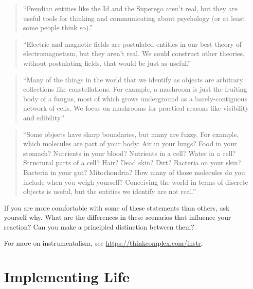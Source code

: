 \documentclass[12pt]{book}
\theoremstyle{exercise}
\begin{document}

\begin{quote}
``Freudian entities like the Id and the Superego aren't real, but they
  are useful tools for thinking and communicating about psychology (or
  at least some people think so).''
\end{quote}


\begin{quote}
``Electric and magnetic fields are postulated entities in our best
  theory of electromagnetism, but they aren't real.  We could
  construct other theories, without postulating fields, that would be
  just as useful.''
\end{quote}


\begin{quote}
``Many of the things in the world that we identify as objects are
  arbitrary collections like constellations.  For example, a mushroom
  is just the fruiting body of a fungus, most of which grows
  underground as a barely-contiguous network of cells.  We focus
  on mushrooms for practical reasons like visibility and edibility.''
\end{quote}


\begin{quote}
``Some objects have sharp boundaries, but many are fuzzy.  For
  example, which molecules are part of your body: Air in your lungs?
  Food in your stomach?  Nutrients in your blood?  Nutrients in a
  cell?  Water in a cell?  Structural parts of a cell?  Hair?  Dead
  skin?  Dirt?  Bacteria on your skin?  Bacteria in your gut?
  Mitochondria?  How many of those molecules do you include when you
  weigh yourself?  Conceiving the world in terms of discrete objects
  is useful, but the entities we identify are not real.''
\end{quote}

If you are more comfortable with some of these statements than
others, ask yourself why.  What are the differences in these
scenarios that influence your reaction?  Can you make
a principled distinction between them?

For more on instrumentalism, see
\url{https://thinkcomplex.com/instr}.



\section{Implementing Life}
\label{implife}
\end{document}
